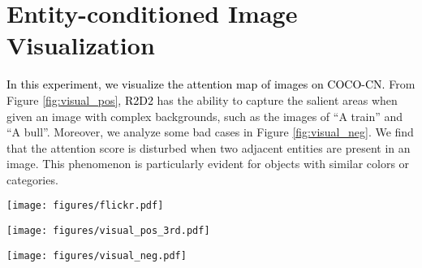\documentclass[sigconf]{acmart}
\def\mmcr{\textcolor{black}}
\begin{document}
\section{Entity-conditioned Image Visualization}
\label{vis-appendix}
\mmcr{In this experiment, we visualize the attention map of images on COCO-CN.}
From Figure \ref{fig:visual_pos}, 
\mmcr{R2D2} has the ability to capture the salient areas when given an image with complex backgrounds,
such as the images of ``A train'' and ``A bull''.
Moreover, we analyze some bad cases in Figure \ref{fig:visual_neg}. We find that the attention score is disturbed when two adjacent entities are present in an image. This phenomenon is particularly evident for objects with similar colors or categories.






\begin{figure*}[h]
    \renewcommand\thefigure{C}
    \centering
	\texttt{[image: figures/flickr.pdf]}
	\caption{Comparisons of Flickr30k, Flickr30k-CN and our proposed Flickr30k-CNA.} 
	\label{fig:flickr}
\end{figure*}




\begin{figure*}[h]
    \renewcommand\thefigure{D}
    \centering
	\texttt{[image: figures/visual\_pos\_3rd.pdf]}
	\caption{More Examples of entity-conditioned image visualization.} 
	\label{fig:visual_pos}
\end{figure*}

\begin{figure*}[h]
    \renewcommand\thefigure{E}
    \centering
	\texttt{[image: figures/visual\_neg.pdf]}
	\caption{Bad cases of entity-conditioned image visualization.}
	\label{fig:visual_neg}
\end{figure*}
\end{document}
